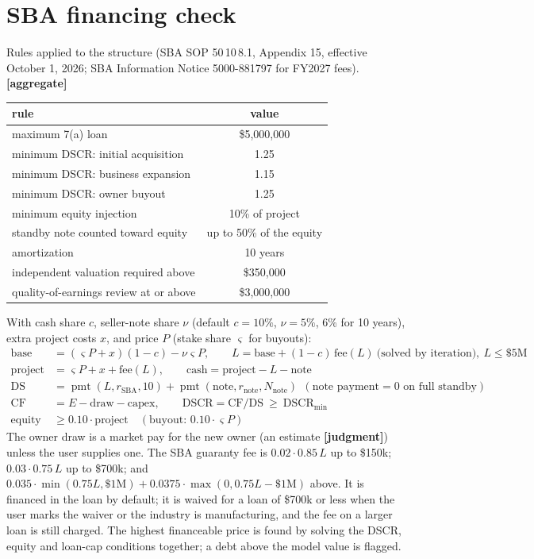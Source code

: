 \documentclass[11pt]{article}
\newcommand{\agg}{\textbf{[aggregate]}}
\newcommand{\jud}{\textbf{[judgment]}}
\begin{document}
\section{SBA financing check}
Rules applied to the structure (SBA SOP 50\,10\,8.1, Appendix 15, effective October 1, 2026; SBA Information Notice 5000-881797 for FY2027 fees). \agg
\begin{center}\small\begin{tabular}{lc}\toprule
rule & value\\\midrule
maximum 7(a) loan & \$5,000,000\\
minimum DSCR: initial acquisition & 1.25\\
minimum DSCR: business expansion & 1.15\\
minimum DSCR: owner buyout & 1.25\\
minimum equity injection & 10\% of project\\
standby note counted toward equity & up to 50\% of the equity\\
amortization & 10 years\\
independent valuation required above & \$350,000\\
quality-of-earnings review at or above & \$3,000,000\\\bottomrule\end{tabular}\end{center}
With cash share $c$, seller-note share $\nu$ (default $c=10\%$, $\nu=5\%$, 6\% for 10 years), extra project costs $x$, and price $P$ (stake share $\varsigma$ for buyouts):
\begin{align}
\text{base}&=(\varsigma P+x)(1-c)-\nu\varsigma P,\qquad L=\text{base}+(1-c)\,\text{fee}(L)\ \text{(solved by iteration)},\ L\le\$5\text{M}\\
\text{project}&=\varsigma P+x+\text{fee}(L),\qquad \text{cash}=\text{project}-L-\text{note}\\
\text{DS}&=\operatorname{pmt}(L,r_{\text{SBA}},10)+\operatorname{pmt}(\text{note},r_{\text{note}},N_{\text{note}})\ \ (\text{note payment}=0\text{ on full standby})\\
\text{CF}&=E-\text{draw}-\text{capex},\qquad \text{DSCR}=\text{CF}/\text{DS}\ \ge\ \text{DSCR}_{\min}\\
\text{equity}&\ge0.10\cdot\text{project}\quad(\text{buyout: }0.10\cdot\varsigma P)
\end{align}
The owner draw is a market pay for the new owner (an estimate \jud) unless the user supplies one. The SBA guaranty fee is $0.02\cdot0.85\,L$ up to \$150k; $0.03\cdot0.75\,L$ up to \$700k; and $0.035\cdot\min(0.75L,\$1\text{M})+0.0375\cdot\max(0,0.75L-\$1\text{M})$ above. It is financed in the loan by default; it is waived for a loan of \$700k or less when the user marks the waiver or the industry is manufacturing, and the fee on a larger loan is still charged. The highest financeable price is found by solving the DSCR, equity and loan-cap conditions together; a debt above the model value is flagged.
\end{document}
